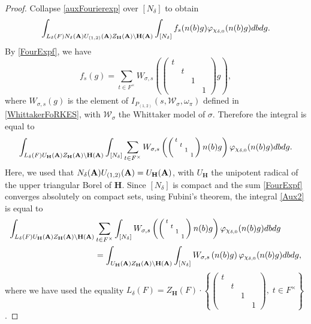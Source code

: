 \documentclass[11pt, reqno]{amsart}
\theoremstyle{plain}
\theoremstyle{definition}
\theoremstyle{remark}
\theoremstyle{plain}
\def\H{{H}}
\def\A{{\bf A}}
\def\H{\mathbf{H}}
\begin{document}
\begin{proof}
Collapse \eqref{auxFourierexp} over $[N_{\delta}]$ to obtain 
\[\int_{L_{\delta}(F)N_{\delta}(\A)U_{(1,2)}(\A)Z_\H(\A)\setminus \H(\A)}\int_{[N_{\delta}]} f_s(n(b)g)\varphi_{\chi_{\delta,0}}(n(b)g)dbdg.\]
By \eqref{FourExpf}, we have
\begin{equation*}f_s(g) = \sum_{t \in F^{\times}}W_{\sigma,s}\left(\left(\begin{smallmatrix}t & & & \\ & t & & \\ & &1& \\ & & &1\end{smallmatrix}\right)g\right),\end{equation*}
where $W_{\sigma,s}(g)$ is the element of  $I_{P_{(1,2)}}\left (s,\mathcal{W}_{\sigma},\omega_{\pi} \right)$ defined in \eqref{WhittakerFoRKES}, with $\mathcal{W}_\sigma$ the Whittaker model of $\sigma$. Therefore the integral is equal to 
\begin{equation}\label{Aux2}\int_{L_{\delta}(F)U_\H(\A)Z_\H(\A)\setminus \H(\A)}\int_{[N_{\delta}]} \sum_{t \in F^{\times}}W_{\sigma,s}\left(\left(\begin{smallmatrix} t & & & \\ & t & & \\ & &1& \\ & & &1\end{smallmatrix}\right)n(b)g\right)\varphi_{\chi_{\delta,0}}(n(b)g)dbdg.\end{equation}
Here, we used that $N_{\delta}(\A)U_{(1,2)}(\A) = U_{\H}(\A)$, with $U_\H$ the unipotent radical of the upper triangular Borel of $\H$. Since $[N_{\delta}]$ is compact and the sum \eqref{FourExpf} converges absolutely on compact sets, using Fubini's theorem, the integral \eqref{Aux2} is equal to 
\begin{align*}\int_{L_{\delta}(F)U_\H(\A)Z_\H(\A)\setminus \H(\A)}&\sum_{t \in F^{\times}}\int_{[N_{\delta}]} W_{\sigma,s}\left(\left(\begin{smallmatrix} t & & & \\ &t & & \\ & &1& \\ & & &1\end{smallmatrix}\right)n(b)g\right)\varphi_{\chi_{\delta,0}}(n(b)g)dbdg \\ &= \int_{U_\H(\A)Z_\H(\A)\setminus \H(\A)}\int_{[N_{\delta}]} W_{\sigma,s}\left(n(b)g\right)\varphi_{\chi_{\delta,0}}(n(b)g)dbdg,\end{align*}
where we have used the equality $L_{\delta}(F) =Z_\H(F)\cdot \left \{\left(\begin{smallmatrix}t& & & \\ & t & & \\ & &1& \\ & & &1\end{smallmatrix}\right),\;t\in F^\times \right \}$.

\end{proof}
\end{document}
